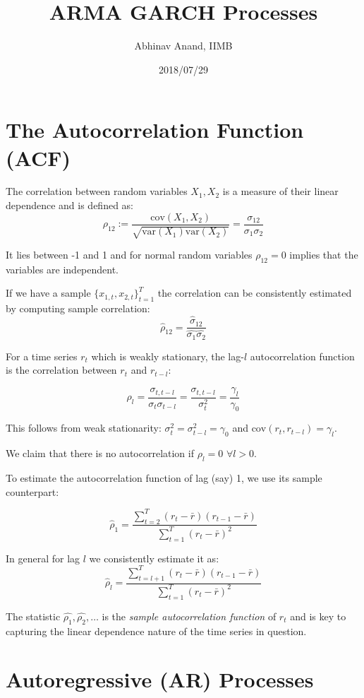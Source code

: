 \documentclass[11pt,]{article}
\title{ARMA GARCH Processes}
\author{Abhinav Anand, IIMB}
\date{2018/07/29}
\begin{document}
\maketitle

\section{The Autocorrelation Function
(ACF)}\label{the-autocorrelation-function-acf}

The correlation between random variables \(X_1, X_2\) is a measure of
their linear dependence and is defined as:
\[\rho_{12}:= \frac{\text{cov}(X_1,X_2)}{\sqrt{\text{var}(X_1)\text{var}(X_2)}}=\frac{\sigma_{12}}{\sigma_1\sigma_2}\]

It lies between -1 and 1 and for normal random variables \(\rho_{12}=0\)
implies that the variables are independent.

If we have a sample \(\{x_{1,t}, x_{2,t}\}_{t=1}^T\) the correlation can
be consistently estimated by computing sample correlation:
\[\hat{\rho}_{12}=\frac{\hat{\sigma}_{12}}{\hat{\sigma_1}\hat{\sigma_2}}\]

For a time series \(r_t\) which is weakly stationary, the lag-\(l\)
autocorrelation function is the correlation between \(r_t\) and
\(r_{t-l}\):

\[\rho_l=\frac{\sigma_{t,t-l}}{\sigma_t\sigma_{t-l}}=\frac{\sigma_{t,t-l}}{\sigma_t^2}
=\frac{\gamma_l}{\gamma_0}\]

This follows from weak stationarity:
\(\sigma^2_t=\sigma^2_{t-l}=\gamma_0\) and
\(\text{cov}(r_t,r_{t-l})=\gamma_l\).

We claim that there is no autocorrelation if \(\rho_l=0\)
\(\forall l>0\).

To estimate the autocorrelation function of lag (say) 1, we use its
sample counterpart:

\[\hat{\rho}_1=\frac{\sum_{t=2}^T (r_t-\bar{r})(r_{t-1}-\bar{r})}{\sum_{t=1}^T (r_t-\bar{r})^2}\]

In general for lag \(l\) we consistently estimate it as:
\[\hat{\rho}_l=\frac{\sum_{t=l+1}^T (r_t-\bar{r})(r_{t-1}-\bar{r})}{\sum_{t=1}^T (r_t-\bar{r})^2}\]

The statistic \(\hat{\rho_1},\hat{\rho_2},\hdots\) is the \emph{sample
autocorrelation function} of \(r_t\) and is key to capturing the linear
dependence nature of the time series in question.

\section{Autoregressive (AR)
Processes}\label{autoregressive-ar-processes}
\end{document}
